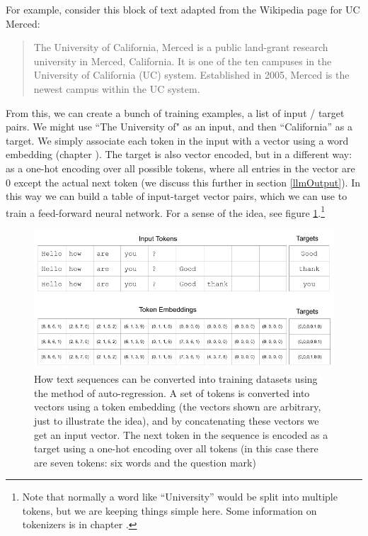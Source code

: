 For example, consider this block of text adapted from the Wikipedia page for UC Merced:

\begin{quote}
The University of California, Merced is a public land-grant research university in Merced, California. It is one of the ten campuses in the University of California (UC) system. Established in 2005, Merced is the newest campus within the UC system.
\end{quote}

From this, we can create a bunch of training examples, a list of input / target pairs. We might use ``The University of" as an input, and then ``California'' as a target. We simply associate each token in the input with a vector using a word embedding (chapter ). The target is also vector encoded, but in a different way: as a one-hot encoding over all possible tokens, where all entries in the vector are 0 except the actual next token (we discuss this further in section \ref{llmOutput}). In this way we can build a table of input-target vector pairs, which we can use to train a feed-forward neural network. For a sense of the idea, see figure \ref{nextWordPrediction}.\footnote{Note that normally a word like ``University'' would be split into multiple tokens, but we are keeping things simple here. Some information on tokenizers is in chapter .} 

\begin{figure}[h]
\centering
\includegraphics[scale=.45]{./images/contextWindow.png}
\caption[Jeff Yoshimi]{How text sequences can be converted into training datasets using the method of auto-regression. A set of tokens is converted into vectors using a token embedding (the vectors shown are arbitrary, just to illustrate the idea), and by concatenating these vectors we get an input vector. The next token in the sequence is encoded as a target using a one-hot encoding over all tokens (in this case there are seven tokens: six words and the question mark)}
\label{nextWordPrediction}
\end{figure}

